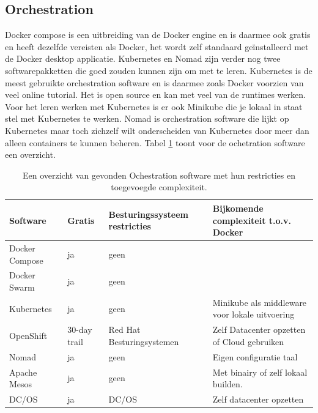 \subsection{Orchestration}
Docker compose is een uitbreiding van de Docker engine en is daarmee ook gratis en heeft dezelfde vereisten als Docker, het wordt zelf standaard geïnstalleerd met de Docker desktop applicatie. Kubernetes en Nomad zijn verder nog twee softwarepakketten die goed zouden kunnen zijn om met te leren. Kubernetes is de meest gebruikte orchestration software en is daarmee zoals Docker voorzien van veel online tutorial. Het is open source en kan met veel van de runtimes werken. Voor het leren werken met Kubernetes is er ook Minikube die je lokaal in staat stel met Kubernetes te werken. Nomad is orchestration software die lijkt op Kubernetes maar toch zichzelf wilt onderscheiden van Kubernetes door meer dan alleen containers te kunnen beheren. Tabel \ref{tab:Ochestration} toont voor de ochetration software een overzicht.
\begin{center}
    \begin{table}
        \begin{tabular}{ m{3cm} || m{1.5cm} | m{3.3cm} | m{4.5cm} }
            Software & Gratis & Besturingssysteem restricties & Bijkomende complexiteit t.o.v. Docker \\ 
            \hline
            Docker Compose & ja & geen &  \\  
            \hline
            Docker Swarm & ja & geen & \\
            \hline 
            Kubernetes & ja & geen & Minikube als middleware voor lokale uitvoering \\
            \hline
            OpenShift & 30-day trail & Red Hat Besturingsystemen & Zelf Datacenter opzetten of Cloud gebruiken \\
            \hline
            Nomad & ja & geen & Eigen configuratie taal \\
            \hline
            Apache Mesos & ja & geen & Met binairy of zelf lokaal builden.  \\
            \hline 
            DC/OS & ja & DC/OS & Zelf datacenter opzetten \\
        \end{tabular}
        \label{tab:Ochestration}
        \caption[Overzicht ochestration]{Een overzicht van gevonden Ochestration software met hun restricties en toegevoegde complexiteit.}
    \end{table}
\end{center}

